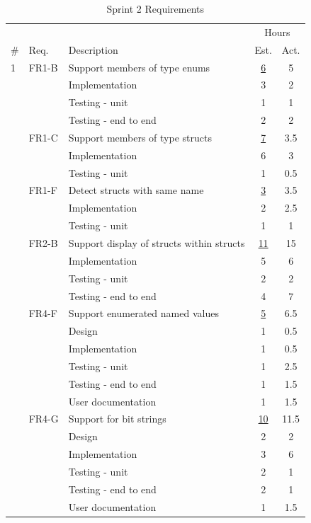 \begin{table}[!ht] \small \center
\caption{Sprint 2 Requirements\label{tab:sprint2req1}}
\begin{tabularx}{\textwidth}{l l X c c}
	\toprule
	& & & \multicolumn{2}{c}{Hours} \\
	\cmidrule(r){4-5}
	\# & Req. & Description & Est. & Act. \\
	\midrule
	1 & FR1-B & Support members of type enums & \underline{ 6 } & 5 \\
	   &  & Implementation & 3 & 2 \\
	   &  & Testing - unit & 1 & 1 \\
	   &  & Testing - end to end & 2 & 2 \\
	\addlinespace
	2 & FR1-C & Support members of type structs & \underline{ 7 } & 3.5 \\
	   &  & Implementation & 6 & 3 \\
	   &  & Testing - unit & 1 & 0.5 \\
	\addlinespace
	3 & FR1-F & Detect structs with same name & \underline{ 3 } & 3.5 \\
	   &  & Implementation & 2 & 2.5 \\
	   &  & Testing - unit & 1 & 1 \\
	\addlinespace
	4 & FR2-B & Support display of structs within structs & \underline{ 11 } & 15 \\
	   &  & Implementation & 5 & 6 \\
	   &  & Testing - unit & 2 & 2 \\
	   &  & Testing - end to end & 4 & 7 \\
	\addlinespace
	5 & FR4-F & Support enumerated named values & \underline{ 5 } & 6.5 \\
	   &  & Design & 1 & 0.5 \\
	   &  & Implementation & 1 & 0.5 \\
	   &  & Testing - unit & 1 & 2.5 \\
	   &  & Testing - end to end & 1 & 1.5 \\
	   &  & User documentation & 1 & 1.5 \\
	\addlinespace
	6 & FR4-G & Support for bit strings & \underline{ 10 } & 11.5 \\
	   &  & Design & 2 & 2 \\
	   &  & Implementation & 3 & 6 \\
	   &  & Testing - unit & 2 & 1 \\
	   &  & Testing - end to end & 2 & 1 \\
	   &  & User documentation & 1 & 1.5 \\
	\bottomrule
\end{tabularx}
\end{table}

